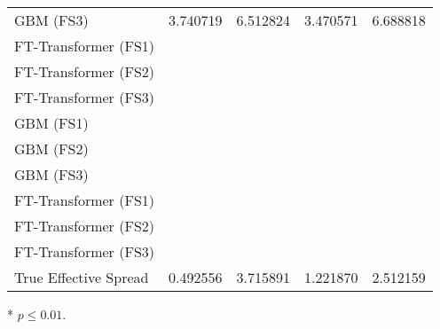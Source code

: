 \begin{threeparttable}
\begin{tabular}{@{}lSSSS@{}}
        \gls{GBM} (FS3)       & 3.740719                                                & 6.512824 \tnote{*}                                       & 3.470571      & 6.688818 \tnote{*}   \\
        FT-Transformer (FS1)  &                                                         & \tnote{*}                                                &               & \tnote{*}            \\
        FT-Transformer (FS2)  &                                                         & \tnote{*}                                                &               & \tnote{*}            \\
        FT-Transformer (FS3)  &                                                         & \tnote{*}                                                &               & \tnote{*}            \\ \midrule
        \gls{GBM} (FS1)       &                                                         & \tnote{*}                                                &               & \tnote{*}            \\
        \gls{GBM} (FS2)       &                                                         & \tnote{*}                                                &               & \tnote{*}            \\
        \gls{GBM} (FS3)       &                                                         & \tnote{*}                                                &               & \tnote{*}            \\
        FT-Transformer (FS1)  &                                                         & \tnote{*}                                                &               & \tnote{*}            \\
        FT-Transformer (FS2)  &                                                         & \tnote{*}                                                &               & \tnote{*}            \\
        FT-Transformer (FS3)  &                                                         & \tnote{*}                                                &               & \tnote{*}            \\ \midrule
        True Effective Spread & 0.492556                                                & 3.715891                                                 & 1.221870      & 2.512159             \\ \bottomrule
    \end{tabular}
    \begin{tablenotes}\footnotesize
        \item[*] $p \leq 0.01$.
    \end{tablenotes}
\end{threeparttable}